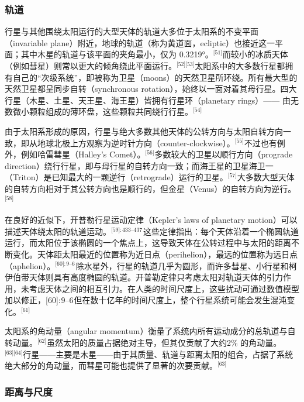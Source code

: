 \subsubsection{轨道}
行星与其他围绕太阳运行的大型天体的轨道大多位于太阳系的不变平面（invariable plane）附近，地球的轨道（称为黄道面，ecliptic）也接近这一平面；其中木星的轨道与该平面的夹角最小，仅为 0.3219°。\(^\text{[51]}\)而较小的冰质天体（例如彗星）则常以更大的倾角绕此平面运行。\(^\text{[52][53]}\)太阳系中的大多数行星都拥有自己的“次级系统”，即被称为卫星（moons）的天然卫星所环绕。所有最大型的天然卫星都呈同步自转（synchronous rotation），始终以一面对着其母行星。四大行星（木星、土星、天王星、海王星）皆拥有行星环（planetary rings）—— 由无数微小颗粒组成的薄环盘，这些颗粒共同绕行行星。\(^\text{[54]}\)

由于太阳系形成的原因，行星与绝大多数其他天体的公转方向与太阳自转方向一致，即从地球北极上方观察为逆时针方向（counter-clockwise）。\(^\text{[55]}\)不过也有例外，例如哈雷彗星（Halley’s Comet）。\(^\text{[56]}\)多数较大的卫星以顺行方向（prograde direction）绕行行星，即与母行星的自转方向一致；而海王星的卫星海卫一（Triton）是已知最大的一颗逆行（retrograde）运行的卫星。\(^\text{[57]}\)大多数大型天体的自转方向相对于其公转方向也是顺行的，但金星（Venus）的自转方向为逆行。\(^\text{[58]}\)

在良好的近似下，开普勒行星运动定律（Kepler’s laws of planetary motion）可以描述天体绕太阳的轨道运动。\(^\text{[59]: 433–437}\) 这些定律指出：每个天体沿着一个椭圆轨道运行，而太阳位于该椭圆的一个焦点上，这导致天体在公转过程中与太阳的距离不断变化。天体距太阳最近的位置称为近日点（perihelion），最远的位置称为远日点（aphelion）。\(^\text{[60]: 9–6 }\)除水星外，行星的轨道几乎为圆形，而许多彗星、小行星和柯伊伯带天体则具有高度椭圆的轨道。开普勒定律只考虑太阳对轨道天体的引力作用，未考虑天体之间的相互引力。在人类的时间尺度上，这些扰动可通过数值模型加以修正，[60]: 9–6 但在数十亿年的时间尺度上，整个行星系统可能会发生混沌变化。\(^\text{[61]}\)

太阳系的角动量（angular momentum）衡量了系统内所有运动成分的总轨道与自转动量。\(^\text{[62]}\)虽然太阳的质量占据绝对主导，但其仅贡献了大约2\% 的角动量。\(^\text{[63][64]}\)行星——主要是木星——由于其质量、轨道与距离太阳的组合，占据了系统绝大部分的角动量，而彗星可能也提供了显著的次要贡献。\(^\text{[63]}\)
\subsubsection{距离与尺度}


